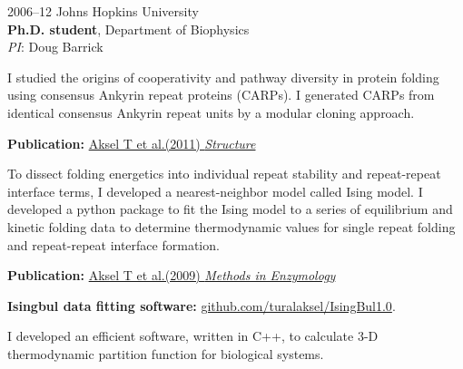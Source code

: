 \documentclass[12pt,letterpaper]{report}
\newcommand{\listitemspace}{0.25em}
\renewenvironment{itemize}
{\begin{list}{}{\setlength{\leftmargin}{0em}
                \setlength{\parskip}{0em}
                \setlength{\itemsep}{\listitemspace}
                \setlength{\parsep}{\listitemspace}}}
{\end{list}}
\begin{document}
\begin{tablist}
        \item[2006--12]\tab{}Johns Hopkins University \\
                             \textbf{Ph.D. student}, Department of Biophysics\\
                             \textit{PI}: Doug Barrick \\
                             \begin{itemize}
                                \item \textbullet \hspace{0.2cm} I studied the origins of cooperativity and pathway diversity in protein folding using consensus Ankyrin repeat proteins (CARPs). I generated CARPs from identical consensus Ankyrin repeat units by a modular cloning approach. 
                                \begin{itemize}
                                    \item \hspace{1cm} \textbf{Publication:} \href{https://doi.org/10.1016/j.str.2010.12.018}{Aksel T et al.(2011) \textit{Structure}}
                                \end{itemize} 
                                \item \textbullet \hspace{0.2cm} To dissect folding energetics into individual repeat stability and repeat-repeat interface terms, I developed a nearest-neighbor model called Ising model. I developed a python package to fit the Ising model to a series of equilibrium and kinetic folding data to determine thermodynamic values for single repeat folding and repeat-repeat interface formation.
                                \begin{itemize}
                                    \item \hspace{1cm} \textbf{Publication:} \href{https://doi.org/10.1016/S0076-6879(08)04204-3}{Aksel T et al.(2009) \textit{Methods in Enzymology}}
                                    \item \hspace{1cm} \textbf{Isingbul data fitting software:} \href{https://github.com/turalaksel/IsingBul1.0} {github.com/turalaksel/IsingBul1.0}.
                                \end{itemize} 

                                \item \textbullet \hspace{0.2cm} I developed an efficient software, written in C++, to calculate 3-D thermodynamic partition function for biological systems.
                            \end{itemize} 
        

\end{tablist}
\end{document}
